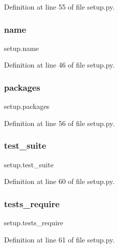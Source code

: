 Definition at line 55 of file setup.\+py.

\hypertarget{namespacesetup_ab3a7a0638d76a01367c5bc3cc699447f}{}\label{namespacesetup_ab3a7a0638d76a01367c5bc3cc699447f} 
\subsubsection{\texorpdfstring{name}{name}}
{\footnotesize\ttfamily setup.\+name}



Definition at line 46 of file setup.\+py.

\hypertarget{namespacesetup_aff2375a361fd5865c77bd9aa093be747}{}\label{namespacesetup_aff2375a361fd5865c77bd9aa093be747} 
\subsubsection{\texorpdfstring{packages}{packages}}
{\footnotesize\ttfamily setup.\+packages}



Definition at line 56 of file setup.\+py.

\hypertarget{namespacesetup_afd7a7f31bfa5027bfe335aedfcc1b70e}{}\label{namespacesetup_afd7a7f31bfa5027bfe335aedfcc1b70e} 
\subsubsection{\texorpdfstring{test\+\_\+suite}{test\_suite}}
{\footnotesize\ttfamily setup.\+test\+\_\+suite}



Definition at line 60 of file setup.\+py.

\hypertarget{namespacesetup_a6369bb060267ccf90b93519796e7cc2c}{}\label{namespacesetup_a6369bb060267ccf90b93519796e7cc2c} 
\subsubsection{\texorpdfstring{tests\+\_\+require}{tests\_require}}
{\footnotesize\ttfamily setup.\+tests\+\_\+require}



Definition at line 61 of file setup.\+py.

